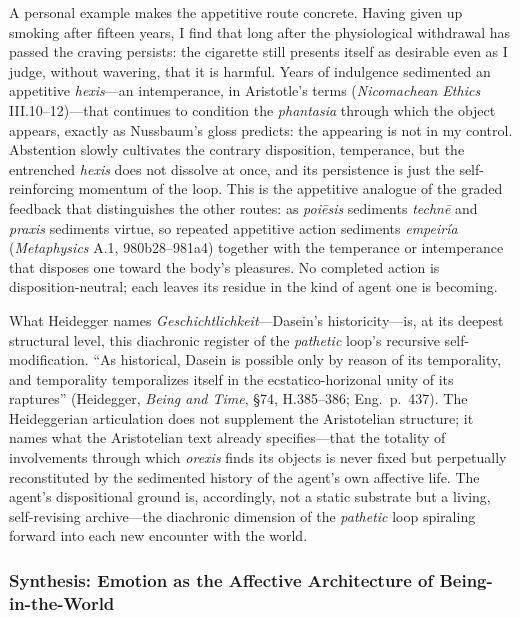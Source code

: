 \documentclass{article}
\begin{document}
A personal example makes the appetitive route concrete. Having given up smoking after fifteen years, I find that long after the physiological withdrawal has passed the craving persists: the cigarette still presents itself as desirable even as I judge, without wavering, that it is harmful. Years of indulgence sedimented an appetitive \textit{hexis}---an intemperance, in Aristotle's terms (\textit{Nicomachean Ethics} III.10--12)---that continues to condition the \textit{phantasia} through which the object appears, exactly as Nussbaum's gloss predicts: the appearing is not in my control. Abstention slowly cultivates the contrary disposition, temperance, but the entrenched \textit{hexis} does not dissolve at once, and its persistence is just the self-reinforcing momentum of the loop. This is the appetitive analogue of the graded feedback that distinguishes the other routes: as \textit{poiēsis} sediments \textit{technē} and \textit{praxis} sediments virtue, so repeated appetitive action sediments \textit{empeiría} (\textit{Metaphysics} A.1, 980b28--981a4) together with the temperance or intemperance that disposes one toward the body's pleasures. No completed action is disposition-neutral; each leaves its residue in the kind of agent one is becoming.

What Heidegger names \textit{Geschichtlichkeit}---Dasein's historicity---is, at its deepest structural level, this diachronic register of the \textit{pathetic} loop's recursive self-modification. ``As historical, Dasein is possible only by reason of its temporality, and temporality temporalizes itself in the ecstatico-horizonal unity of its raptures'' (Heidegger, \textit{Being and Time}, \S 74, H.385--386; Eng.~p.~437). The Heideggerian articulation does not supplement the Aristotelian structure; it names what the Aristotelian text already specifies---that the totality of involvements through which \textit{orexis} finds its objects is never fixed but perpetually reconstituted by the sedimented history of the agent's own affective life. The agent's dispositional ground is, accordingly, not a static substrate but a living, self-revising archive---the diachronic dimension of the \textit{pathetic} loop spiraling forward into each new encounter with the world.


\subsubsection*{Synthesis: Emotion as the Affective Architecture of Being-in-the-World}
\end{document}

